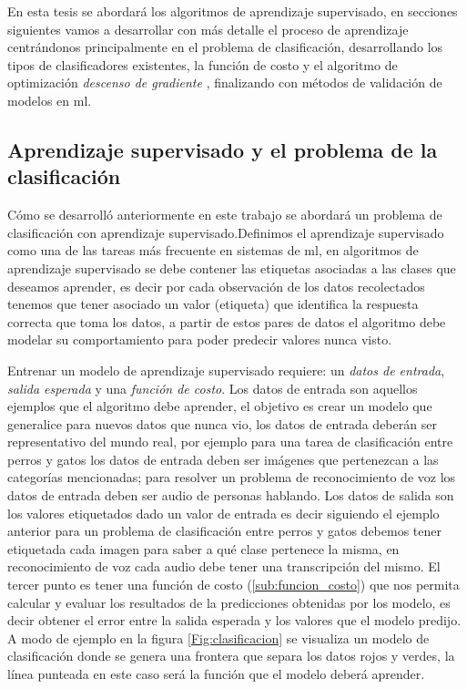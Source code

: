 En esta tesis se abordará los algoritmos de aprendizaje supervisado, en secciones siguientes vamos a desarrollar con más detalle el proceso de aprendizaje centrándonos principalmente en el problema de clasificación, desarrollando los tipos de clasificadores existentes, la función de costo y el algoritmo de optimización \textit{descenso de gradiente} \citep{cnns}, finalizando con métodos de validación de modelos en \ac{ml}.

\subsection{Aprendizaje supervisado y el problema de la clasificación}\label{sub:aprendizaje_supervisado}

Cómo se desarrolló anteriormente en este trabajo se abordará un problema de clasificación con aprendizaje supervisado.Definimos  el aprendizaje supervisado como una de las tareas más frecuente en sistemas de \ac{ml}, en algoritmos de aprendizaje supervisado se debe contener las etiquetas asociadas a las clases que deseamos aprender, es decir por cada observación de los datos recolectados tenemos que tener asociado un valor (etiqueta) que identifica la respuesta correcta que toma los datos, a partir de estos pares de datos el algoritmo debe modelar su comportamiento para poder predecir valores nunca visto.

Entrenar un modelo de aprendizaje supervisado requiere: un \textit{datos de entrada}, \textit{salida esperada} y una \textit{función de costo}.  Los datos de entrada son aquellos ejemplos que el algoritmo debe aprender, el objetivo es crear un modelo que generalice para nuevos datos que nunca vio, los datos de entrada deberán ser representativo del mundo real, por ejemplo para una tarea de clasificación entre perros y gatos los datos de entrada deben ser imágenes que pertenezcan a las categorías mencionadas; para resolver un problema de reconocimiento de voz los datos de entrada deben ser audio de personas hablando. Los datos de salida son los valores etiquetados dado un valor de entrada es decir siguiendo el ejemplo anterior para un problema de clasificación entre perros y gatos debemos tener etiquetada cada imagen para saber a qué clase pertenece la misma, en reconocimiento de voz cada audio debe tener una transcripción del mismo. El tercer punto es tener una función de costo (\ref{sub:funcion_costo}) que nos permita calcular y evaluar  los resultados de la predicciones obtenidas por los modelo, es decir obtener el error entre la salida esperada y los valores que el modelo predijo. A modo de ejemplo en la figura \ref{Fig:clasificacion} se visualiza un modelo de clasificación donde se  genera una frontera que separa los datos rojos y verdes, la línea punteada en este caso será la función que el modelo deberá aprender.

